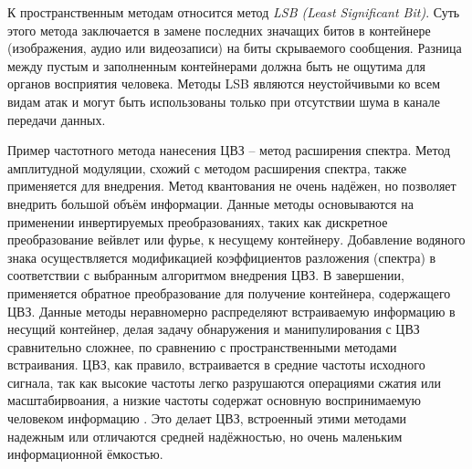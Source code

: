  К пространственным методам относится метод \textit{LSB (Least Significant Bit)}.
Суть этого метода заключается в замене последних значащих битов в контейнере
 (изображения, аудио или видеозаписи) на биты скрываемого сообщения. Разница между пустым и заполненным контейнерами должна быть не ощутима
  для органов восприятия человека. Методы LSB являются неустойчивыми ко всем видам атак и могут быть использованы только при отсутствии шума в канале передачи данных.

Пример частотного метода нанесения ЦВЗ -- метод расширения спектра. Метод амплитудной модуляции, схожий с методом расширения спектра, также применяется для внедрения. Метод квантования не очень надёжен, но позволяет внедрить большой объём информации.
 Данные методы основываются на применении инвертируемых преобразованиях, таких как дискретное преобразование вейвлет или фурье, к несущему контейнеру. Добавление водяного знака осуществляется модификацией коэффициентов разложения (спектра) в соответствии с выбранным алгоритмом внедрения ЦВЗ. В завершении, применяется обратное преобразование для получение контейнера, содержащего ЦВЗ. Данные методы неравномерно распределяют встраиваемую информацию в несущий контейнер, делая задачу обнаружения и манипулирования с ЦВЗ сравнительно сложнее, по сравнению с пространственными методами встраивания. ЦВЗ, как правило, встраивается в средние частоты исходного сигнала, так как высокие частоты легко разрушаются операциями сжатия или масштабирвоания, а низкие частоты содержат основную воспринимаемую человеком информацию \cite{asatryan2009}. Это делает ЦВЗ, встроенный этими методами надежным или
  отличаются средней надёжностью, но очень маленьким информационной
   ёмкостью. 
   
